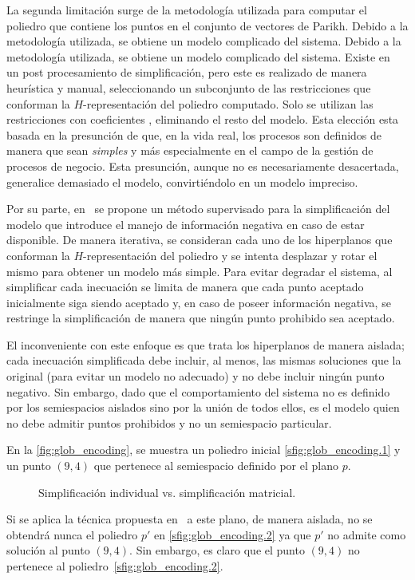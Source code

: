 La segunda limitación surge de la metodología utilizada para computar el poliedro que contiene los 
puntos en el conjunto de vectores de Parikh. Debido a la metodología utilizada, se obtiene un 
modelo complicado del sistema. Debido a la metodología utilizada, se obtiene un 
modelo complicado del sistema. Existe en~\cite{CarmonaC14} un post procesamiento de simplificación, pero este es
realizado de manera heurística y manual, seleccionando un subconjunto de las restricciones que conforman la
$H$-representación del poliedro computado. Solo se utilizan las restricciones con coeficientes , 
eliminando el resto del modelo. 
Esta elección esta basada en la presunción de que, en la vida real, los procesos son definidos de manera
que sean \textit{simples} y más especialmente en el campo de la gestión de procesos de negocio. Esta presunción,
aunque no es necesariamente desacertada, generalice demasiado el modelo, convirtiéndolo en un modelo
impreciso.

Por su parte, en~\cite{LeonCB15} se propone un método supervisado para la simplificación del modelo que 
introduce el manejo de información negativa en caso de estar disponible.
De manera iterativa, se consideran cada uno de los hiperplanos que conforman la $H$-representación del poliedro
y se intenta desplazar y rotar el mismo para obtener un modelo más simple.
Para evitar degradar el sistema, al simplificar cada inecuación se limita de manera que cada punto aceptado
inicialmente siga siendo aceptado y, en caso de poseer información negativa, se restringe la simplificación
de manera que ningún punto prohibido sea aceptado.

El inconveniente con este enfoque es que trata los hiperplanos de manera aislada; cada inecuación
simplificada debe incluir, al menos, las mismas soluciones que la original (para evitar un modelo no adecuado) y no
debe incluir ningún punto negativo. Sin embargo, dado que el comportamiento del sistema no es definido por los 
semiespacios aislados sino por la unión de todos ellos, es el modelo quien no debe admitir puntos prohibidos 
y no un semiespacio particular.

\begin{example}
    \label{ex:prob_gen}
    En la \autoref{fig:glob_encoding}, se muestra un poliedro inicial \autoref{sfig:glob_encoding.1} 
    y un punto $(9,4)$ que pertenece al semiespacio definido por el plano $p$.

    \begin{figure}[H]
      \centering
      \hfill
      \caption{Simplificación individual vs. simplificación matricial.}
      \label{fig:glob_encoding}
    \end{figure}

    Si se aplica la técnica propuesta en~\cite{LeonCB15} a este plano, de manera aislada,
    no se obtendrá nunca el poliedro $p'$ en \autoref{sfig:glob_encoding.2} ya que
    $p'$ no admite como solución al punto $(9,4)$. 
    Sin embargo, es claro que el punto $(9,4)$ no pertenece al poliedro~\autoref{sfig:glob_encoding.2}.
\end{example}

